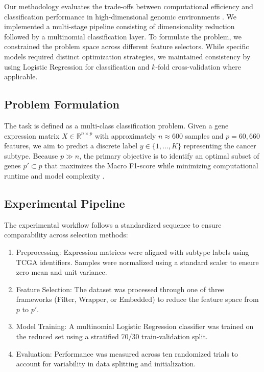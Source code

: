 \documentclass{article}
\begin{document}
Our methodology evaluates the trade-offs between computational efficiency and classification performance in high-dimensional genomic environments \cite{hdlss_curse, genomic_benchmarking}. We implemented a multi-stage pipeline consisting of dimensionality reduction followed by a multinomial classification layer. To formulate the problem, we constrained the problem space across different feature selectors. While specific models required distinct optimization strategies, we maintained consistency by using Logistic Regression for classification and $k$-fold cross-validation where applicable.

\subsection{Problem Formulation}

The task is defined as a multi-class classification problem. Given a gene expression matrix $X \in \mathbb{R}^{n \times p}$ with approximately $n \approx 600$ samples and $p = 60{,}660$ features, we aim to predict a discrete label $y \in \{1, \dots, K\}$ representing the cancer subtype. Because $p \gg n$, the primary objective is to identify an optimal subset of genes $p' \subset p$ that maximizes the Macro F1-score while minimizing computational runtime and model complexity \cite{hdlss_curse}.

\subsection{Experimental Pipeline}

The experimental workflow follows a standardized sequence to ensure comparability across selection methods:

\begin{enumerate}
    \item Preprocessing: Expression matrices were aligned with subtype labels using TCGA identifiers. Samples were normalized using a standard scaler to ensure zero mean and unit variance.
    
    \item Feature Selection: The dataset was processed through one of three frameworks (Filter, Wrapper, or Embedded) to reduce the feature space from $p$ to $p'$.
    
    \item Model Training: A multinomial Logistic Regression classifier was trained on the reduced set using a stratified 70/30 train-validation split.
    
    \item Evaluation: Performance was measured across ten randomized trials to account for variability in data splitting and initialization.
\end{enumerate}
\end{document}
